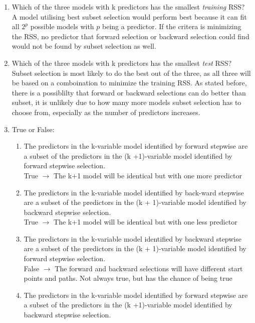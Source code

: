 \documentclass[12pt]{article}
\begin{document}
\medspace

\begin{enumerate}
    \item Which of the three models with k predictors has the smallest \emph{training} RSS?\\
          A model utilising best subset selection would perform best because it can fit all $2^p$ possible models with $p$ being a predictor. If the critera is minimizing the RSS, no predictor that forward selection or  backward selection could find would not be found by subset selection as well.
    \item Which of the three models with k predictors has the smallest \emph{test} RSS?\\
          Subset selection is most likely to do the best out of the three, as all three will be based on a comboination to minimize the training RSS. As stated before, there is a possiblilty that forward or backward selections can do better than subset, it is unlikely due to how many more models subset selection has to choose from, especially as the number of predictors increases.
    \item True or False:
          \begin{enumerate}[label=(\roman*)]
              \item The predictors in the k-variable model identified by forward stepwise are a subset of the predictors in the (k +1)-variable model identified by forward stepwise selection.\\
                    True $\rightarrow$ The k+1 model will be identical but with one more predictor
              \item The predictors in the k-variable model identified by back-ward stepwise are a subset of the predictors in the (k + 1)-variable model identified by backward stepwise selection.\\
                    True $\rightarrow$ The k+1 model will be identical but with one less predictor
              \item The predictors in the k-variable model identified by backward stepwise are a subset of the predictors in the (k + 1)-variable model identified by forward stepwise selection.\\
                    False $\rightarrow$ The forward and backward selections will have different start points and paths. Not always true, but has the chance of being true
              \item The predictors in the k-variable model identified by forward stepwise are a subset of the predictors in the (k +1)-variable model identified by backward stepwise selection.\\

\end{enumerate}
\end{enumerate}
\end{document}

